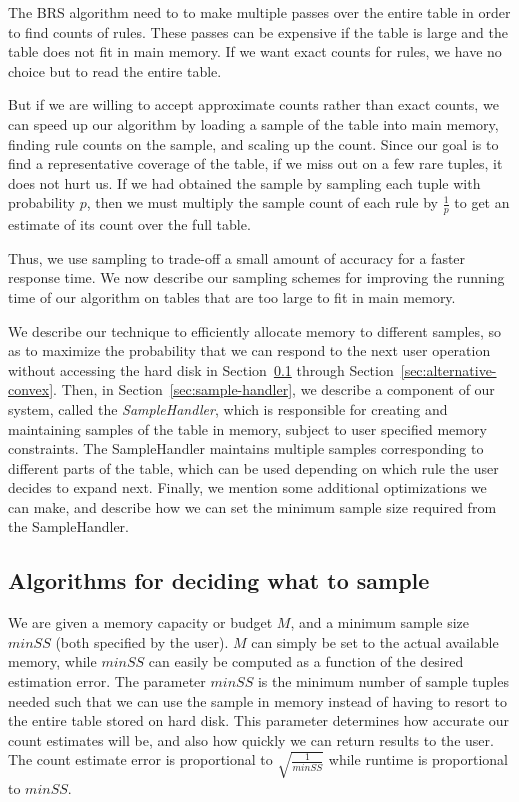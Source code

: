 \documentclass[10pt,journal,compsoc]{IEEEtran}
\newcounter{prob}
\newcommand{\techreporttext}[1]{#1}
\begin{document}
\techreporttext{
The BRS algorithm need to to make multiple passes over the entire table in order to find counts of rules. These passes can be expensive if the table is large and the table does not fit in main memory. If we want exact counts for rules, we have no choice but to read the entire table. 

But if we are willing to accept approximate counts rather than exact counts, we can speed up our algorithm by loading a sample of the table into main memory, finding rule counts on the sample, and scaling up the count. Since our goal is to find a representative coverage of the table, if we miss out on a few rare tuples, it does not hurt us. If we had obtained the sample by sampling each tuple with probability $p$, then we must multiply the sample count of each rule by $\frac{1}{p}$ to get an estimate of its count over the full table. 

Thus, we use sampling to trade-off a small amount of accuracy for a faster response time. We now describe our sampling schemes for improving the running time of our algorithm on tables that are too large to fit in main memory. 

We describe our technique to efficiently allocate memory to different samples, so as to maximize the probability that we can respond to the next user operation without accessing the hard disk in Section~\ref{sec:sampling_algorithms} through Section~\ref{sec:alternative-convex}. 
Then, in Section~\ref{sec:sample-handler}, we describe a component of our system, called the {\em SampleHandler}, which is responsible for creating and maintaining samples of the table in memory, subject to user specified memory constraints. The SampleHandler maintains multiple samples corresponding to different parts of the table, which can be used depending on which rule the user decides to expand next. Finally, we mention some additional optimizations we can make, and
describe how we can set the minimum sample size required from the SampleHandler.

\subsection{Algorithms for deciding what to sample}\label{sec:sampling_algorithms}

We are given a memory capacity or budget $M$, and a minimum sample size $minSS$ (both specified by the user). $M$ can simply be set to the actual available memory, while $minSS$ can easily be computed as a function of the desired estimation error.
The parameter $minSS$ is the minimum number of sample tuples needed
such that we can use the sample in memory 
instead of having to resort to the entire table stored
on hard disk. 
This parameter determines how accurate our count estimates will be, and also
how quickly we can return results to the user. The count estimate error is proportional to $\sqrt{\frac{1}{minSS}}$ while runtime is proportional to $minSS$.

}
\end{document}
